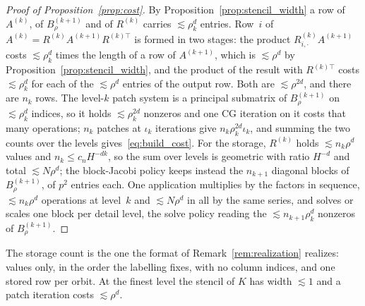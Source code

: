 \documentclass[hidelinks]{siamart}
\theoremstyle{nonumberplain}
\numberwithin{theorem}{section}
\begin{document}
\begin{proof}[Proof of Proposition~\textup{\ref{prop:cost}}]
By Proposition~\ref{prop:stencil_width} a row of $A^{(k)}$, of
$B^{(k+1)}_\rho$ and of $R^{(k)}$ carries $\lesssim \rho_k^d$ entries.
Row~$i$ of $A^{(k)} = R^{(k)} A^{(k+1)} R^{(k)\top}$ is formed in two
stages: the product $R^{(k)}_{i,\cdot} A^{(k+1)}$ costs
$\lesssim \rho_k^d$ times the length of a row of $A^{(k+1)}$, which is
$\lesssim \rho^d$ by Proposition~\ref{prop:stencil_width}, and the
product of the result with $R^{(k)\top}$ costs $\lesssim \rho_k^d$ for
each of the $\lesssim \rho^d$ entries of the output row.  Both are
$\lesssim \rho^{2d}$, and there are $n_k$ rows.  The level-$k$ patch system is a principal submatrix of
$B^{(k+1)}_\rho$ on $\lesssim \rho_k^d$ indices, so it holds
$\lesssim \rho_k^{2d}$ nonzeros and one CG iteration on it costs that
many operations; $n_k$ patches at $\iota_k$ iterations give
$n_k \rho_k^{2d} \iota_k$, and summing the two counts over the levels
gives~\eqref{eq:build_cost}.  For the storage, $R^{(k)}$ holds
$\lesssim n_k \rho^d$ values and $n_k \leq c_n H^{-dk}$, so the sum over
levels is geometric with ratio $H^{-d}$ and total $\lesssim N \rho^d$;
the block-Jacobi policy keeps instead the $n_{k+1}$ diagonal blocks of
$B^{(k+1)}_\rho$, of $p^2$ entries each.  One application multiplies by
the factors in sequence, $\lesssim n_k \rho^d$ operations at level~$k$
and $\lesssim N \rho^d$ in all by the same series, and solves or scales
one block per detail level, the solve policy reading the
$\lesssim n_{k+1} \rho_k^d$ nonzeros of $B^{(k+1)}_\rho$.
\end{proof}

The storage count is the one the format of
Remark~\ref{rem:realization} realizes: values only, in the order the
labelling fixes, with no column indices, and one stored row per orbit.
At the finest level the stencil of $K$ has width $\lesssim 1$ and a patch
iteration costs $\lesssim \rho^d$.
\end{document}
